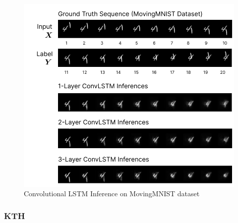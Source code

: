 \documentclass{scrartcl}
\begin{document}
\begin{figure}[H]
	\begin{center}
		\includegraphics[width=1\textwidth]{images/mmnist/mmnist_inferences_2.png}
	\end{center}
	\caption{Convolutional LSTM Inference on MovingMNIST dataset}
	\label{img:lstm_mmnist_inference_2}
\end{figure}

\subsubsection{KTH}
\label{subsubsec:kth}
\end{document}
